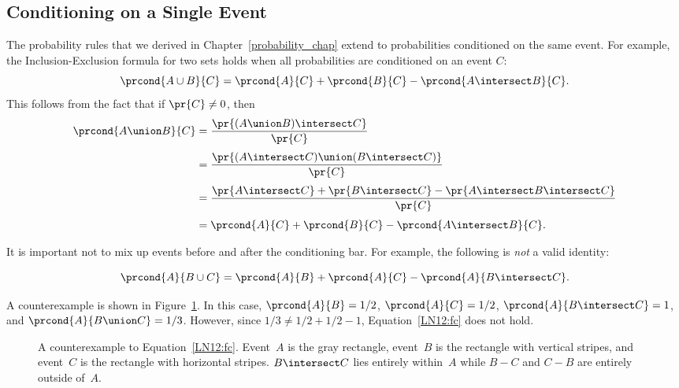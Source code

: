 \subsection{Conditioning on a Single Event}\label{cond_ident_subsec}

The probability rules that we derived in Chapter~\ref{probability_chap}
extend to probabilities conditioned on the same event.  For example,
the Inclusion-Exclusion formula for two sets holds when all
probabilities are conditioned on an event $C$:
\[
\prcond{A \cup B}{C} = \prcond{A}{C} + \prcond{B}{C} - \prcond{A \intersect B}{C}.
\]
This follows from the fact that if $\pr{C} \neq 0$, then
\begin{align*}
\prcond{A \union B}{C}
    &= \frac{\pr{(A \union B) \intersect C}}{\pr{C}} \\[3pt]
    &= \frac{\pr{(A \intersect C) \union (B \intersect C)}}{\pr{C}} \\[3pt]
    &= \frac{\pr{A \intersect C} + \pr{B \intersect C}
             - \pr{A \intersect B \intersect C}}
            {\pr{C}} \\[3pt]
    &= \prcond{A}{C} + \prcond{B}{C} - \prcond{A \intersect B}{C}.
\end{align*}

It is important not to mix up events before and after the conditioning
bar.  For example, the following is \emph{not} a valid identity:
%
\begin{falseclm*}
\begin{equation}\label{LN12:fc}
\prcond{A}{B \cup C} = \prcond{A}{B} + \prcond{A}{C} - \prcond{A}{B \intersect C}.
\end{equation}
\end{falseclm*}

A counterexample is shown in Figure~\ref{fig:15D2}.  In this case,
$\prcond{A}{B} = 1/2$, $\prcond{A}{C} = 1/2$, $\prcond{A}{B \intersect
  C} = 1$, and $\prcond{A}{B \union C} = 1/3$.  However, since
$1/3 \ne 1/2 + 1/2 - 1$, Equation~\ref{LN12:fc} does not hold.
%
\begin{figure}[h]



\caption{A counterexample to Equation~\ref{LN12:fc}.  Event~$A$ is the
  gray rectangle, event~$B$ is the rectangle with vertical stripes,
  and event~$C$ is the rectangle with horizontal stripes.  $B
  \intersect C$ lies entirely within~$A$ while $B - C$ and $C - B$ are
  entirely outside of~$A$.}

\label{fig:15D2}

\end{figure}

